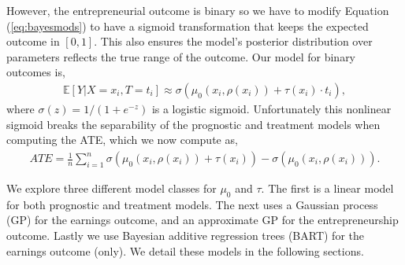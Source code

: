 \documentclass[12pt, a4paper]{article}
\begin{document}
However, the entrepreneurial outcome is binary so we have to modify Equation
(\ref{eq:bayesmods}) to have a sigmoid transformation that keeps the expected
outcome in $[0, 1]$. This also ensures the model's posterior distribution over
parameters reflects the true range of the outcome. Our model for binary
outcomes is, 
\begin{align}
  \mathbb{E}[Y|X{=}x_i, T{=}t_i] \approx \sigma\!\left(
  \mu_0(x_i, \rho(x_i)) + \tau(x_i)\cdot t_i\right), \label{eq:bayesmods_clf}
\end{align}
where $\sigma(z) = 1 / (1 + e^{-z})$ is a logistic sigmoid. Unfortunately this
nonlinear sigmoid breaks the separability of the prognostic and treatment
models when computing the ATE, which we now compute as, 
\begin{align*} \hat{ATE} =
  \frac{1}{n}\sum^n_{i=1} \sigma\!\left( \mu_0(x_i, \rho(x_i)) + \tau(x_i)
  \right) - \sigma\!\left( \mu_0(x_i, \rho(x_i)) \right).
\end{align*}

We explore three different model classes for $\mu_0$ and $\tau$. The first is a
linear model for both prognostic and treatment models. The next uses a Gaussian
process (GP) for the earnings outcome, and an approximate GP for the
entrepreneurship outcome. Lastly we use Bayesian additive regression trees
(BART) for the earnings outcome (only). We detail these models in the following
sections. 

\end{document}
